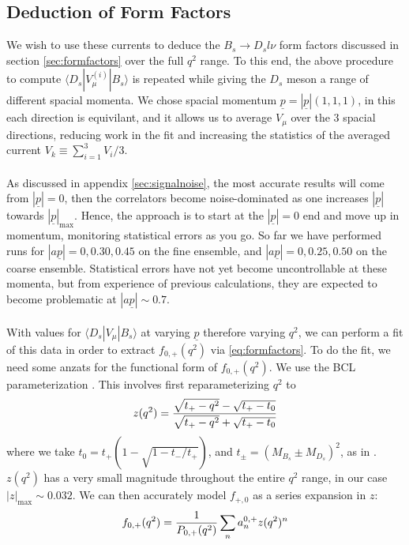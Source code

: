 \subsection{Deduction of Form Factors}

We wish to use these currents to deduce the $B_s\to D_s l\nu$ form factors discussed in section \ref{sec:formfactors} over the full $q^2$ range. To this end, the above procedure to compute $\langle D_s | V^{(i)}_{\mu} | B_s \rangle$ is repeated while giving the $D_s$ meson a range of different spacial momenta. We chose spacial momentum $\underline{p} = |\underline{p}|(1,1,1)$, in this each direction is equivilant, and it allows us to average $V_{\mu}$ over the 3 spacial directions, reducing work in the fit and increasing the statistics of the averaged current $V_k \equiv \sum_{i=1}^3 V_i / 3$.
\\ \\
As discussed in appendix \ref{sec:signalnoise}, the most accurate results will come from $|\underline{p}| = 0$, then the correlators become noise-dominated as one increases $|\underline{p}|$ towards $|\underline{p}|_{\text{max}}$. Hence, the approach is to start at the $|\underline{p}|=0$ end and move up in momentum, monitoring statistical errors as you go. So far we have performed runs for $|a\underline{p}| = 0,0.30,0.45$ on the fine ensemble, and $|a\underline{p}|=0,0.25,0.50$ on the coarse ensemble. Statistical errors have not yet become uncontrollable at these momenta, but from experience of previous calculations, they are expected to become problematic at $|a\underline{p}| \sim 0.7$. 
\\ \\
With values for $\langle D_s | V_{\mu} | B_s \rangle$ at varying $\underline{p}$ therefore varying $q^2$, we can perform a fit of this data in order to extract $f_{0,+}(q^2)$ via \eqref{eq:formfactors}. To do the fit, we need some anzats for the functional form of $f_{0,+}(q^2)$. We use the BCL parameterization \cite{PhysRevD.79.013008}. This involves first reparameterizing $q^2$ to 
\begin{align}
	z(q^2) = {\sqrt{t_+ - q^2} - \sqrt{t_+ - t_0} \over \sqrt{t_+ - q^2} + \sqrt{t_+ - t_0} }
\end{align}
where we take $t_0 = t_+( 1 - \sqrt{1 - t_-/t_+})$, and $t_{\pm} = (M_{B_s} \pm M_{D_s})^2$, as in \cite{Hill:2006ub}. $z(q^2)$ has a very small magnitude throughout the entire $q^2$ range, in our case $|z|_{\text{max}} \sim 0.032$. We can then accurately model $f_{+,0}$ as a series expansion in $z$:
\begin{align}
	f_{0,+}(q^2) = {1\over P_{0,+}(q^2)} \sum_n a^{0,+}_n z(q^2)^n
	\label{eq:zexpansion}
\end{align}
